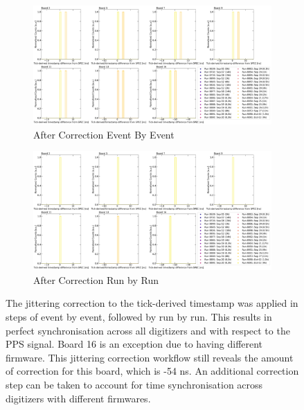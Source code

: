 \begin{figure}[htbp!]

\begin{subfigure}[h]{1.00\linewidth}
\centering    
\includegraphics[width=\linewidth]{Tickts_spec_corrEbyE}
\caption{After Correction Event By Event}
\label{subfig:Tickts_spec_corrEbyE}
\end{subfigure}

\hfill
\begin{subfigure}[h]{1.00\linewidth}
\centering    
\includegraphics[width=\linewidth]{Tickts_spec_corrRbyR}
\caption{After Correction Run by Run}
\label{subfig:Tickts_spec_corrRbyR}
\end{subfigure}%

\caption[jitterCorrEbyERbyR]{
The jittering correction to the tick-derived timestamp was applied in steps of event by event, followed by run by run.
This results in perfect synchronisation across all digitizers and with respect to the PPS signal.
Board 16 is an exception due to having different firmware. 
This jittering correction workflow still reveals the amount of correction for this board, which is -54 ns. 
An additional correction step can be taken to account for time synchronisation across digitizers with different firmwares. 
}
\label{fig:Tickts_spec_corr}
\end{figure}

